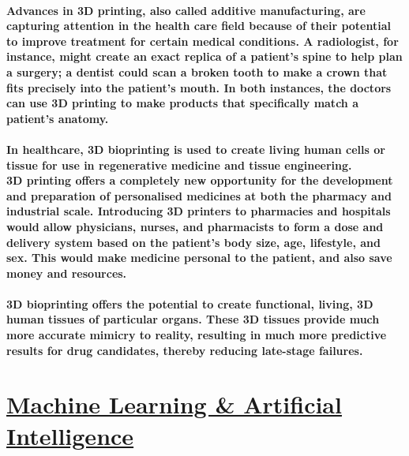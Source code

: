 \documentclass[12pt]{article}
\begin{document}
    \paragraph{Advances in 3D printing, also called additive manufacturing, are capturing attention in the health care field because of their potential to improve treatment for certain medical conditions. A radiologist, for instance, might create an exact replica of a patient’s spine to help plan a surgery; a dentist could scan a broken tooth to make a crown that fits precisely into the patient’s mouth. In both instances, the doctors can use 3D printing to make products that specifically match a patient’s anatomy.
    \\\\In healthcare, 3D bioprinting is used to create living human cells or tissue for use in regenerative medicine and tissue engineering.
    \\3D printing offers a completely new opportunity for the development and preparation of personalised medicines at both the pharmacy and industrial scale. Introducing 3D printers to pharmacies and hospitals would allow physicians, nurses, and pharmacists to form a dose and delivery system based on the patient’s body size, age, lifestyle, and sex. This would make medicine personal to the patient, and also save money and resources.
    \\\\3D bioprinting offers the potential to create functional, living, 3D human tissues of particular organs. These 3D tissues provide much more accurate mimicry to reality, resulting in much more predictive results for drug candidates, thereby reducing late-stage failures.}
	\section{\underline{Machine Learning \& Artificial Intelligence}}
\end{document}
